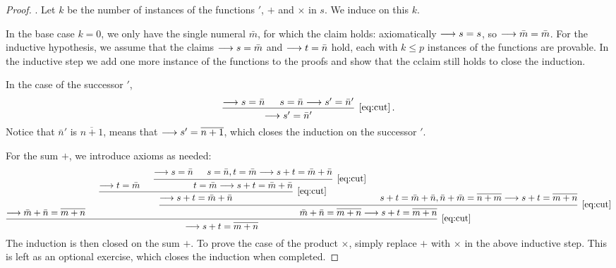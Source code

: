 \documentclass[11pt,a4paper]{article}
\begin{document}
\begin{proof}.
    Let \(k\) be the number of instances of the functions
    \('\), \(+\) and \(\times\) in \(s\). We induce on this \(k\).

    In the base case \(k=0\), we only have the single numeral \(\bar m\),
    for which the claim holds: axiomatically \(\longrightarrow s=s\), so \(\longrightarrow\bar m=\bar m\).
    For the inductive hypothesis, we assume that the claims \(\longrightarrow s=\bar m\)
    and \(\longrightarrow t=\bar n\) hold, each with \(k\leq p\) instances of the functions are provable.
    In the inductive step we add one more instance of the functions to the proofs
    and show that the cclaim still holds to close the induction.

    In the case of the successor \(\prime\),
    \begin{equation*}
        \begin{prooftree}
            \hypo{\seq s=\bar n}
            \hypo{s=\bar n \seq s'=\bar n'}
            \infer2[\eqref{eq:cut}]{\seq s'=\bar n'}
        \end{prooftree} \,.
    \end{equation*}
    Notice that \(\bar n'\) is \(\overline{n+1}\),
    means that \(\longrightarrow s'=\overline{n+1}\), which closes the induction on
    the successor \(\prime\).

    For the sum \(+\), we introduce axioms as needed:
    \scriptsize
    \begin{equation*}
        \begin{prooftree}
            \hypo{\seq \bar m+\bar n = \overline{m + n}}
            \hypo{\seq t = \bar m}
            \hypo{\seq s = \bar n}
            \hypo{s = \bar n, t = \bar m \seq s + t = \bar m + \bar n}
            \infer2[\eqref{eq:cut}]{t = \bar m \seq s + t = \bar m + \bar n}
            \infer2[\eqref{eq:cut}]{\seq s+t = \bar m + \bar n}
            \hypo{s+t = \bar m + \bar n, \bar n + \bar m = \overline{n + m}\seq s+t = \overline{m + n}}
            \infer2[\eqref{eq:cut}]{\bar m+\bar n = \overline{m + n}\seq s+t = \overline{m + n}}
            \infer2[\eqref{eq:cut}]{\seq s+t=\overline{m + n}}
        \end{prooftree}
    \end{equation*}
    \normalsize
    The induction is then closed on the sum \(+\).
    To prove the case of the product \(\times\), simply replace \(+\)
    with \(\times\) in the above inductive step. This is left as an optional exercise,
    which closes the induction when completed.


\end{proof}
\end{document}
